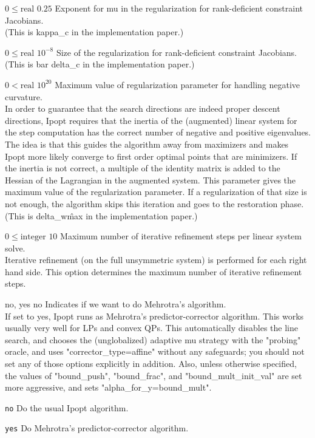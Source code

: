 %
{$0\leq\textrm{real}$}%
{$0.25$}%
{Exponent for mu in the regularization for rank-deficient constraint Jacobians.\\
(This is kappa\_c in the implementation paper.)}%
{}

%
{$0\leq\textrm{real}$}%
{$10^{- 8}$}%
{Size of the regularization for rank-deficient constraint Jacobians.\\
(This is bar delta\_c in the implementation paper.)}%
{}

%
{$0<\textrm{real}$}%
{$10^{ 20}$}%
{Maximum value of regularization parameter for handling negative curvature.\\
In order to guarantee that the search directions are indeed proper descent directions, Ipopt requires that the inertia of the (augmented) linear system for the step computation has the correct number of negative and positive eigenvalues. The idea is that this guides the algorithm away from maximizers and makes Ipopt more likely converge to first order optimal points that are minimizers. If the inertia is not correct, a multiple of the identity matrix is added to the Hessian of the Lagrangian in the augmented system. This parameter gives the maximum value of the regularization parameter. If a regularization of that size is not enough, the algorithm skips this iteration and goes to the restoration phase. (This is delta\_w\^max in the implementation paper.)}%
{}

%
{$0\leq\textrm{integer}$}%
{$10$}%
{Maximum number of iterative refinement steps per linear system solve.\\
Iterative refinement (on the full unsymmetric system) is performed for each right hand side.  This option determines the maximum number of iterative refinement steps.}%
{}

%
{\ttfamily no, yes}%
{no}%
{Indicates if we want to do Mehrotra's algorithm.\\
If set to yes, Ipopt runs as Mehrotra's predictor-corrector algorithm. This works usually very well for LPs and convex QPs.  This automatically disables the line search, and chooses the (unglobalized) adaptive mu strategy with the "probing" oracle, and uses "corrector\_type=affine" without any safeguards; you should not set any of those options explicitly in addition.  Also, unless otherwise specified, the values of "bound\_push", "bound\_frac", and "bound\_mult\_init\_val" are set more aggressive, and sets "alpha\_for\_y=bound\_mult".}%
{\begin{list}{}{
\setlength{\parsep}{0em}
\setlength{\leftmargin}{5ex}
\setlength{\labelwidth}{2ex}
\setlength{\itemindent}{0ex}
\setlength{\topsep}{0pt}}
\item[\texttt{no}] Do the usual Ipopt algorithm.
\item[\texttt{yes}] Do Mehrotra's predictor-corrector algorithm.
\end{list}
}

